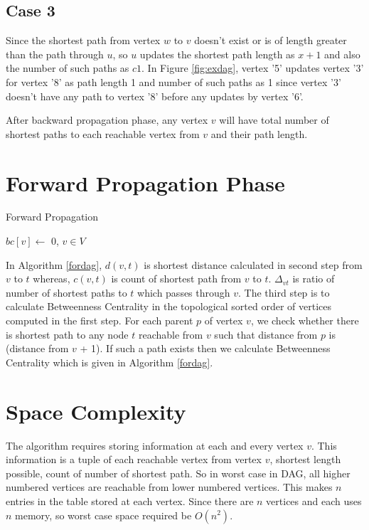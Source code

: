 \subsection{Case 3}
Since the shortest path from vertex $w$ to $v$ doesn't exist or is of length greater than the path through $u$, so $u$ updates the shortest path length as $x + 1$ and also the number of such paths as $c1$.
In Figure \ref{fig:exdag}, vertex '5' updates vertex '3' for vertex '8' as path length 1 and number of such paths as 1 since vertex '3' doesn't have any path to vertex '8' before any updates by vertex '6'. 

After backward propagation phase, any vertex $v$ will have total number of shortest paths to each reachable vertex from $v$ and their path length.
\section{Forward Propagation Phase}

\begin{algorithm}
\caption{Forward Propagation}
\label{fordag}
$bc[v] \leftarrow$ 0, $v \in V$\;

\end{algorithm}

In Algorithm \ref{fordag}, $d(v,t)$ is shortest distance calculated in second step from $v$ to $t$ whereas, $c(v,t)$ is count of shortest path from $v$ to $t$. $\Delta_{vt}$ is ratio of number of shortest paths to $t$ which passes through $v$. 
The third step is to calculate Betweenness Centrality in the topological sorted order of vertices computed in the first step. For each parent $p$ of vertex $v$, we check whether there is shortest path to any node $t$ reachable from $v$ such that distance from $p$ is (distance from $v$ + 1). If such a path exists then we calculate Betweenness Centrality which is given in Algorithm \ref{fordag}. 

\section{Space Complexity}
The algorithm requires storing information at each and every vertex $v$. This information is a tuple of each reachable vertex from vertex $v$, shortest length possible, count of number of shortest path.
So in worst case in DAG, all higher numbered vertices are reachable from lower numbered vertices. This makes $n$ entries in the table stored at each vertex. Since there are $n$ vertices and each uses $n$ memory, so worst case space required be $O(n^2)$. 

